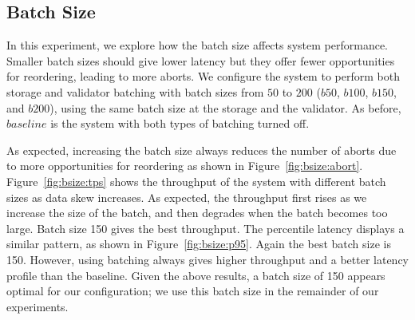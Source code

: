 \subsection{Batch Size}
In this experiment, we explore how the batch size affects system performance. 
Smaller batch sizes should give lower latency but they offer fewer opportunities for reordering, leading to more aborts. 
We configure the system to perform both storage and validator batching with batch sizes from $50$ to $200$ ($b50$, $b100$, $b150$, and $b200$), using the same batch size at the storage and the validator. As before, $baseline$ is the system with both types of batching turned off. 

As expected, increasing the batch size always reduces the number of aborts due to more opportunities for reordering as shown in Figure~\ref{fig:bsize:abort}. 
Figure~\ref{fig:bsize:tps} shows the throughput of the system with different batch sizes as data skew increases. As expected, the throughput first rises as we increase the size of the batch, and then degrades when the batch becomes too large. Batch size 150 gives the best throughput.
The percentile latency displays a similar pattern, as shown in Figure~\ref{fig:bsize:p95}. Again the best batch size is 150. However, using batching always gives higher throughput and a better latency profile than the baseline. Given the above results, a batch size of 150 appears optimal for our configuration; we use this batch size in the remainder of our experiments. 